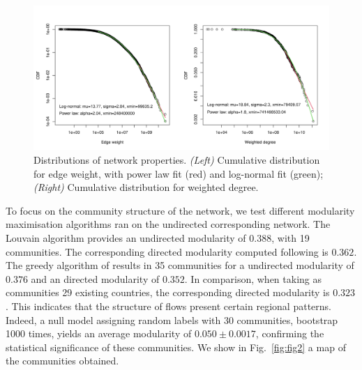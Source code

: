 \documentclass[10pt,letterpaper]{article}
\begin{document}
\begin{figure}
    \begin{center}
        \includegraphics[width=\linewidth]{figures/Fig1.png}
    \end{center}
    \vspace{2cm}
    \caption{Distributions of network properties. \textit{(Left)} Cumulative distribution for edge weight, with power law fit (red) and log-normal fit (green); \textit{(Right)} Cumulative distribution for weighted degree.}
    \label{fig:nwdist}
\end{figure}


To focus on the community structure of the network, we test different modularity maximisation algorithms ran on the undirected corresponding network. The Louvain algorithm \cite{blondel2008fast} provides an undirected modularity of $0.388$, with 19 communities. The corresponding directed modularity computed following \cite{nicosia2009extending} is $0.362$. The greedy algorithm of \cite{clauset2004finding} results in 35 communities for a undirected modularity of $0.376$ and an directed modularity of $0.352$. In comparison, when taking as communities 29 existing countries, the corresponding directed modularity is $0.323$. This indicates that the structure of flows present certain regional patterns. Indeed, a null model assigning random labels with 30 communities, bootstrap 1000 times, yields an average modularity of $0.050 \pm 0.0017$, confirming the statistical significance of these communities. We show in Fig.~\ref{fig:fig2} a map of the communities obtained.
\end{document}
